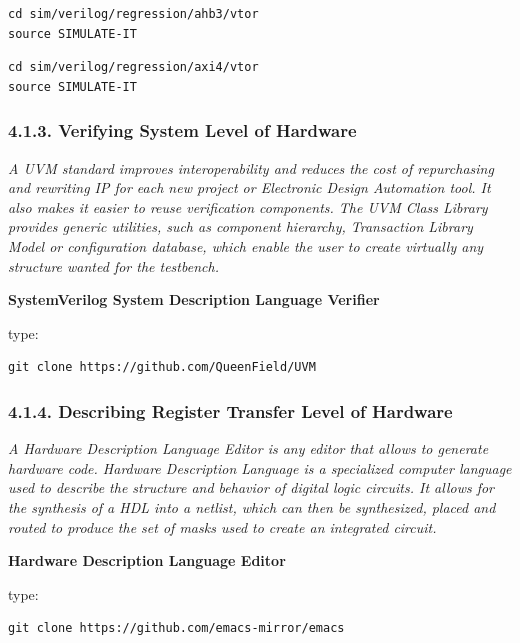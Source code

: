 \documentclass[
]{article}
\begin{document}
\begin{verbatim}
cd sim/verilog/regression/ahb3/vtor
source SIMULATE-IT
\end{verbatim}

\begin{verbatim}
cd sim/verilog/regression/axi4/vtor
source SIMULATE-IT
\end{verbatim}

\hypertarget{verifying-system-level-of-hardware}{%
\subsubsection{4.1.3. Verifying System Level of
Hardware}\label{verifying-system-level-of-hardware}}

\emph{A UVM standard improves interoperability and reduces the cost of
repurchasing and rewriting IP for each new project or Electronic Design
Automation tool. It also makes it easier to reuse verification
components. The UVM Class Library provides generic utilities, such as
component hierarchy, Transaction Library Model or configuration
database, which enable the user to create virtually any structure wanted
for the testbench.}

\textbf{SystemVerilog System Description Language Verifier}

type:

\begin{verbatim}
git clone https://github.com/QueenField/UVM
\end{verbatim}

\hypertarget{describing-register-transfer-level-of-hardware}{%
\subsubsection{4.1.4. Describing Register Transfer Level of
Hardware}\label{describing-register-transfer-level-of-hardware}}

\emph{A Hardware Description Language Editor is any editor that allows
to generate hardware code. Hardware Description Language is a
specialized computer language used to describe the structure and
behavior of digital logic circuits. It allows for the synthesis of a HDL
into a netlist, which can then be synthesized, placed and routed to
produce the set of masks used to create an integrated circuit.}

\textbf{Hardware Description Language Editor}

type:

\begin{verbatim}
git clone https://github.com/emacs-mirror/emacs
\end{verbatim}
\end{document}
